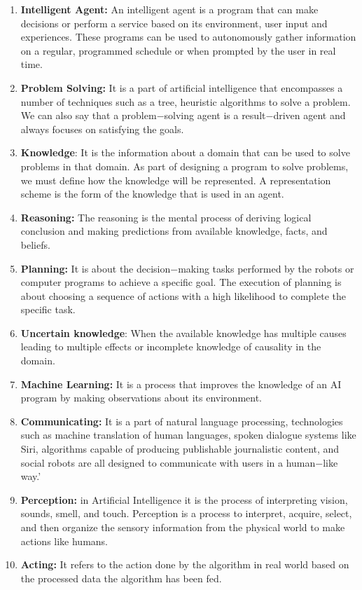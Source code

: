 \documentclass[12pt]{article}
\begin{document}
\begin{enumerate}
	\item \textbf{Intelligent Agent: }An intelligent agent is a program that can make decisions or perform a service based on its environment, user input and experiences. These programs can be used to autonomously gather information on a regular, programmed schedule or when prompted by the user in real time.

	\item \textbf{Problem Solving: }It is a part of artificial intelligence that encompasses a number of techniques such as a tree, heuristic algorithms to solve a problem. We can also say that a problem$-$solving agent is a result$-$driven agent and always focuses on satisfying the goals.

	\item \textbf{Knowledge}: It is the information about a domain that can be used to solve problems in that domain. As part of designing a program to solve problems, we must define how the knowledge will be represented. A representation scheme is the form of the knowledge that is used in an agent.

	\item \textbf{Reasoning: }The reasoning is the mental process of deriving logical conclusion and making predictions from available knowledge, facts, and beliefs.

	\item \textbf{Planning:} It is about the decision$-$making tasks performed by the robots or computer programs to achieve a specific goal. The execution of planning is about choosing a sequence of actions with a high likelihood to complete the specific task.

	\item \textbf{Uncertain knowledge}: When the available knowledge has multiple causes leading to multiple effects or incomplete knowledge of causality in the domain.

	\item \textbf{Machine Learning: }It is a process that improves the knowledge of an AI program by making observations about its environment.

	\item \textbf{Communicating:} It is a part of natural language processing, technologies such as machine translation of human languages, spoken dialogue systems like Siri, algorithms capable of producing publishable journalistic content, and social robots are all designed to communicate with users in a human$-$like way.’

	\item \textbf{Perception:} in Artificial Intelligence it is the process of interpreting vision, sounds, smell, and touch. Perception is a process to interpret, acquire, select, and then organize the sensory information from the physical world to make actions like humans.

	\item \textbf{Acting:} It refers to the action done by the algorithm in real world based on the processed data the algorithm has been fed.\end{enumerate}
\end{document}
